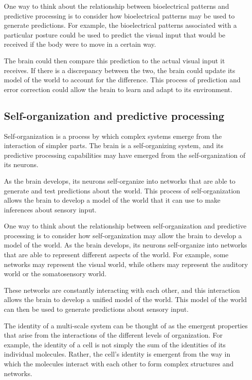 One way to think about the relationship between bioelectrical patterns and predictive processing is to consider how bioelectrical patterns may be used to generate predictions. For example, the bioelectrical patterns associated with a particular posture could be used to predict the visual input that would be received if the body were to move in a certain way.

The brain could then compare this prediction to the actual visual input it receives. If there is a discrepancy between the two, the brain could update its model of the world to account for the difference. This process of prediction and error correction could allow the brain to learn and adapt to its environment.

\subsection{Self-organization and predictive processing} \cite{friston_world_2021}
Self-organization is a process by which complex systems emerge from the interaction of simpler parts. The brain is a self-organizing system, and its predictive processing capabilities may have emerged from the self-organization of its neurons.

As the brain develops, its neurons self-organize into networks that are able to generate and test predictions about the world. This process of self-organization allows the brain to develop a model of the world that it can use to make inferences about sensory input.

One way to think about the relationship between self-organization and predictive processing is to consider how self-organization may allow the brain to develop a model of the world. As the brain develops, its neurons self-organize into networks that are able to represent different aspects of the world. For example, some networks may represent the visual world, while others may represent the auditory world or the somatosensory world.

These networks are constantly interacting with each other, and this interaction allows the brain to develop a unified model of the world. This model of the world can then be used to generate predictions about sensory input.

The identity of a multi-scale system can be thought of as the emergent properties that arise from the interactions of the different levels of organization. For example, the identity of a cell is not simply the sum of the identities of its individual molecules. Rather, the cell's identity is emergent from the way in which the molecules interact with each other to form complex structures and networks.

